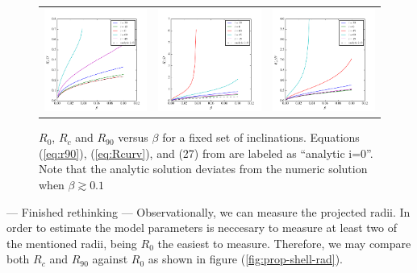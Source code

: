 \begin{figure}
\begin{tabular}{ccc}
\includegraphics[width=0.35\linewidth]{R0-b}&
\includegraphics[width=0.35\linewidth]{Rc-b} &
\includegraphics[width=0.35\linewidth]{R90-b}
\end{tabular}
\caption{$R_0$, $R_c$ and $R_{90}$ versus $\beta$ for a fixed set of inclinations. Equations (\ref{eq:r90}), (\ref{eq:Rcurv}), and (27) from \CRW{}
are labeled as ``analytic i=0''. Note that the analytic solution deviates from the numeric solution when $\beta \gtrsim 0.1$}
\label{fig:rad-beta}
\end{figure}

--- Finished rethinking ---
Observationally, we can measure the projected radii. In order to estimate the model parameters is neccesary to measure at least two of the mentioned radii, being $R_0$ the
easiest to measure. Therefore, we may compare both $R_c$ and $R_{90}$ against $R_0$ as shown in figure (\ref{fig:prop-shell-rad}). 

